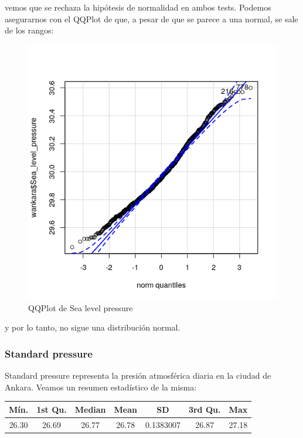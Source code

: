 vemos que se rechaza la hipótesis de normalidad en ambos tests. Podemos asegurarnos con el QQPlot de que, a pesar de que se parece a una normal, se sale de los rangos:

\begin{figure}[H] %
	\centering
	\includegraphics[scale=0.7]{qq-slp.png}  %
	\caption{QQPlot de Sea level pressure} 
	\label{fig:qq-slp}
\end{figure}


y por lo tanto, no sigue una distribución normal.

\subsubsection{Standard pressure}

Standard pressure representa la presión atmosférica diaria en la ciudad de Ankara. Veamos un resumen estadístico de la misma:

\begin{table}[H]
	\centering
	\begin{tabular}{|c|c|c|c|c|c|c|}
		\hline
		Mín.  & 1st Qu. & Median & Mean  & SD        & 3rd Qu. & Max   \\ \hline
		26.30 & 26.69   & 26.77  & 26.78 & 0.1383007 & 26.87   & 27.18 \\ \hline
	\end{tabular}
\end{table}

